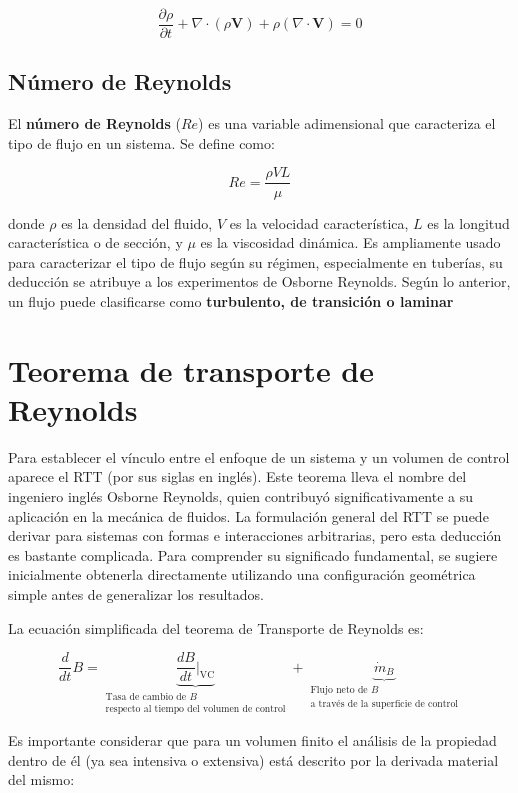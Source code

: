 \documentclass[10pt, oneside]{article}
\begin{document}
\[
\frac{\partial \rho}{\partial t} + \nabla \cdot (\rho \mathbf{V}) + \rho(\nabla \cdot \mathbf{V}) = 0
\]

\subsection{Número de Reynolds}

El \textbf{número de Reynolds} ($Re$) es una variable adimensional que caracteriza el tipo de flujo en un sistema. Se define como:

\[
Re = \frac{\rho V L}{\mu}
\]

donde $\rho$ es la densidad del fluido, $V$ es la velocidad característica, $L$ es la longitud característica o de sección, y $\mu$ es la viscosidad dinámica. Es ampliamente usado para caracterizar el tipo de flujo según su régimen, especialmente en tuberías, su deducción se atribuye a los experimentos de Osborne Reynolds. Según lo anterior, un flujo puede clasificarse como \textbf{turbulento, de transición o laminar}


\section{Teorema de transporte de Reynolds}
Para establecer el vínculo entre el enfoque de un sistema y un volumen de control aparece el RTT (por sus siglas en inglés). Este teorema lleva el nombre del ingeniero inglés Osborne Reynolds, quien contribuyó significativamente a su aplicación en la mecánica de fluidos. La formulación general del RTT se puede derivar para sistemas con formas e interacciones arbitrarias, pero esta deducción es bastante complicada. Para comprender su significado fundamental, se sugiere inicialmente obtenerla directamente utilizando una configuración geométrica simple antes de generalizar los resultados.


La ecuación simplificada del teorema de Transporte de Reynolds es:

\begin{equation}
    \frac{d}{dt}B = \underbrace{\frac{dB}{dt}\Bigr|_{\text{VC}}}_{\substack{\text{Tasa de cambio de } B \\\text{respecto al tiempo del volumen de control}}} + \underbrace{\dot{m}_B}_{\substack{\text{Flujo neto de } B \\\text{a través de la superficie de control}}}
\end{equation}

Es importante considerar que para un volumen finito el análisis de la propiedad dentro de él (ya sea intensiva o extensiva) está descrito por la derivada material del mismo:
\end{document}

